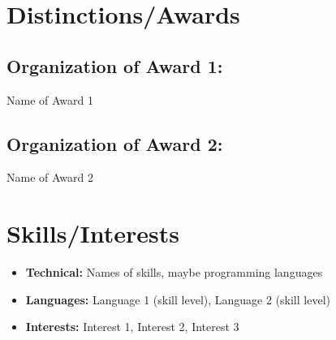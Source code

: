 \documentclass{article}
\newcommand{\awardname}[1]{
    \hspace{0em}
    {#1}
}
\begin{document}
    \section{Distinctions/Awards}

        \subsection{Organization of Award 1:}
            \awardname{Name of Award 1}
        \subsection{Organization of Award 2:}
            \awardname{Name of Award 2}
    \section{Skills/Interests}
        \begin{itemize}
            \item {\bfseries Technical:} Names of skills, maybe programming languages
            \item {\bfseries Languages:} Language 1 (skill level), Language 2 (skill level)
            \item {\bfseries Interests:} Interest 1, Interest 2, Interest 3
        \end{itemize}
\end{document}
